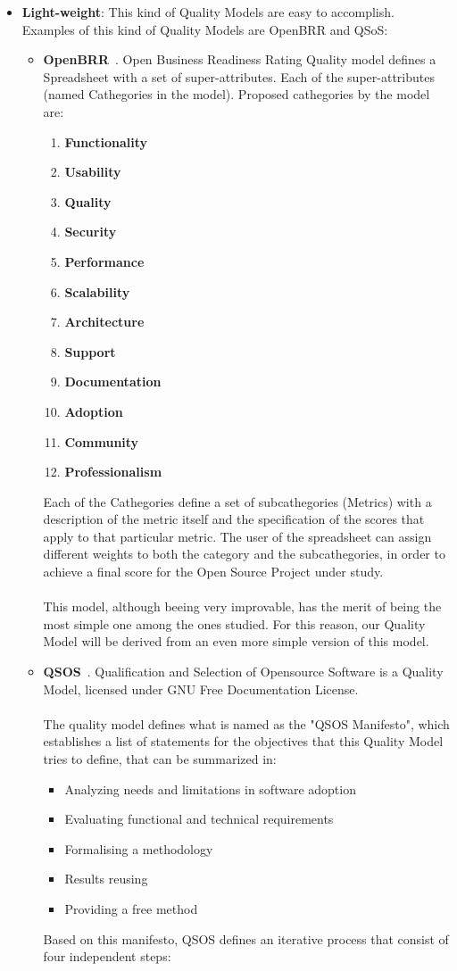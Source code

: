 \documentclass[11pt]{article}
\begin{document}
\begin{itemize}\itemsep0pt
\item{\textbf{Light-weight}}: This kind of Quality Models are easy to accomplish. Examples of this kind of Quality Models are OpenBRR and QSoS:
\begin{itemize}\itemsep0pt
\item{\textbf{OpenBRR}}~\cite{OPENBRR00}.
Open Business Readiness Rating Quality model defines a Spreadsheet with a set of super-attributes. Each of the super-attributes (named Cathegories in the model). Proposed cathegories by the model are:
\begin{enumerate}\itemsep0pt
\item{\textbf{Functionality}}
\item{\textbf{Usability}}
\item{\textbf{Quality}}
\item{\textbf{Security}}
\item{\textbf{Performance}}
\item{\textbf{Scalability}}
\item{\textbf{Architecture}}
\item{\textbf{Support}}
\item{\textbf{Documentation}}
\item{\textbf{Adoption}}
\item{\textbf{Community}}
\item{\textbf{Professionalism}}
\end{enumerate}
Each of the Cathegories define a set of subcathegories (Metrics) with a description of the metric itself and the specification of the scores that apply to that particular metric. The user of the spreadsheet can assign different weights to both the category and the subcathegories, in order to achieve a final score for the Open Source Project under study.\\
\\
This model, although beeing very improvable, has the merit of being the most simple one among the ones studied. For this reason, our Quality Model will be derived from an even more simple version of this model.
\item{\textbf{QSOS}}~\cite{QSOS00}. Qualification and Selection of Opensource Software is a Quality Model, licensed under GNU Free Documentation License.\\
\\
The quality model defines what is named as the "QSOS Manifesto", which establishes a list of statements for the objectives that this Quality Model tries to define, that can be summarized in:
\begin{itemize}\itemsep0pt
\item{Analyzing needs and limitations in software adoption}
\item{Evaluating functional and technical requirements}
\item{Formalising a methodology}
\item{Results reusing}
\item{Providing a free method}
\end{itemize}
Based on this manifesto, QSOS defines an iterative process that consist of four independent steps:


\end{itemize}
\end{itemize}
\end{document}
